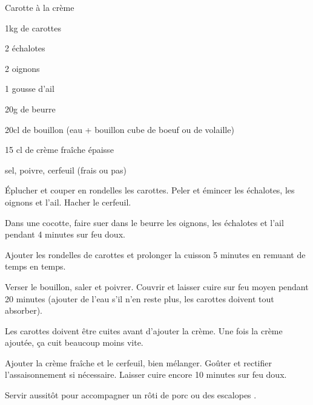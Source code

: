 \begin{recette}{Carotte à la crème}
\begin{ingredients}
\item  1kg de carottes
\item 2 échalotes
\item 2 oignons
\item 1 gousse d'ail
\item 20g de beurre
\item 20cl de bouillon (eau + bouillon cube de boeuf ou de volaille)
\item 15 cl de crème fraîche épaisse
\item sel, poivre, cerfeuil (frais ou pas)
\end{ingredients}

\begin{preparation}
\item Éplucher et couper en rondelles les carottes. Peler et émincer les échalotes, les oignons et l’ail. Hacher le cerfeuil.

\item Dans une cocotte, faire suer dans le beurre les oignons, les échalotes et l’ail pendant 4 minutes sur feu doux.

\item Ajouter les rondelles de carottes et prolonger la cuisson 5 minutes en remuant de temps en temps.

\item Verser le bouillon, saler et poivrer. Couvrir et laisser cuire sur feu moyen pendant 20 minutes (ajouter de l'eau s'il n'en reste plus, les carottes doivent tout absorber).

\begin{remarque}
Les carottes doivent être cuites avant d'ajouter la crème. Une fois la crème ajoutée, ça cuit beaucoup moins vite.
\end{remarque}

\item Ajouter la crème fraîche et le cerfeuil, bien mélanger. Goûter et rectifier l’assaisonnement si nécessaire. Laisser cuire encore 10 minutes sur feu doux.

\item Servir aussitôt pour accompagner un rôti de porc ou des escalopes .
\end{preparation}

\end{recette}

